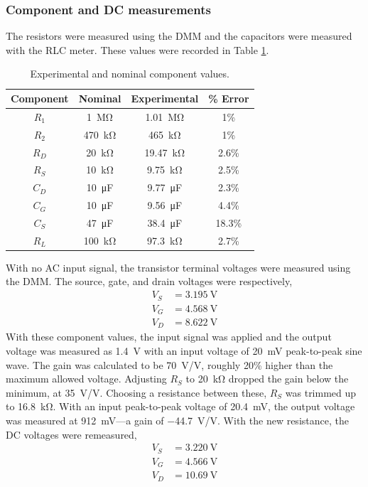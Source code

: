 \documentclass{report}
\begin{document}
\subsubsection{Component and DC measurements}
The resistors were measured using the DMM and the capacitors were measured with the RLC meter. These values were recorded in Table \ref{table:lab1components}.
\begin{table}[H]
	\centering
	\caption{Experimental and nominal component values.}
	\label{table:lab1components}
	\begin{threeparttable}
		\begin{tabular}{cccc}
			\toprule
			Component & Nominal & Experimental & \% Error  \\
			\midrule
			$R_1$ & \SI{1}{\Mohm} & \SI{1.01}{\Mohm} & 1\% \\
			$R_2$ & \SI{470}{\kohm} & \SI{465}{\kohm} & 1\% \\
			$R_D$ & \SI{20}{\kohm} & \SI{19.47}{\kohm} & 2.6\% \\
			$R_S$ & \SI{10}{\kohm} & \SI{9.75}{\kohm} & 2.5\% \\
			$C_D$ & \SI{10}{\micro\farad} & \SI{9.77}{\micro\farad} & 2.3\% \\
			$C_G$ & \SI{10}{\micro\farad} & \SI{9.56}{\micro\farad} & 4.4\% \\
			$C_S$ & \SI{47}{\micro\farad} & \SI{38.4}{\micro\farad} & 18.3\% \\
			$R_L$ & \SI{100}{\kohm} & \SI{97.3}{\kohm} & 2.7\% \\
			\bottomrule
		\end{tabular}
	\end{threeparttable}
\end{table}
With no AC input signal, the transistor terminal voltages were measured using the DMM. The source, gate, and drain voltages were respectively, \begin{align*}
	V_S & = \SI{3.195}{\V} \\
	V_G & = \SI{4.568}{\V} \\
	V_D & = \SI{8.622}{\V}
\end{align*}
With these component values, the input signal was applied and the output voltage was measured as \SI{1.4}{\V} with an input voltage of \SI{20}{\mV} peak-to-peak sine wave. The gain was calculated to be \SI{70}{\V/\V}, roughly 20\% higher than the maximum allowed voltage. Adjusting $R_S$ to \SI{20}{\kohm} dropped the gain below the minimum, at \SI{35}{\V/\V}. Choosing a resistance between these, $R_S$ was trimmed up to \SI{16.8}{\kohm}. With an input peak-to-peak voltage of \SI{20.4}{\mV}, the output voltage was measured at \SI{912}{\mV}---a gain of \SI{-44.7}{\V/\V}. With the new resistance, the DC voltages were remeasured, \begin{align*}
	V_S & = \SI{3.220}{\V} \\
	V_G & = \SI{4.566}{\V} \\
	V_D & = \SI{10.69}{\V}
\end{align*}
\end{document}
